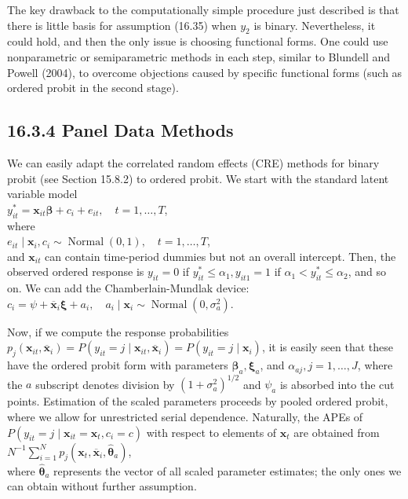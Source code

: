 \documentclass[10pt]{article}
\begin{document}
The key drawback to the computationally simple procedure just described is that there is little basis for assumption (16.35) when $y_{2}$ is binary. Nevertheless, it could hold, and then the only issue is choosing functional forms. One could use nonparametric or semiparametric methods in each step, similar to Blundell and Powell (2004), to overcome objections caused by specific functional forms (such as ordered probit in the second stage).

\subsection*{16.3.4 Panel Data Methods}
We can easily adapt the correlated random effects (CRE) methods for binary probit (see Section 15.8.2) to ordered probit. We start with the standard latent variable model\\
$y_{i t}^{*}=\mathbf{x}_{i t} \boldsymbol{\beta}+c_{i}+e_{i t}, \quad t=1, \ldots, T$,\\
where\\
$e_{i t} \mid \mathbf{x}_{i}, c_{i} \sim \operatorname{Normal}(0,1), \quad t=1, \ldots, T$,\\
and $\mathbf{x}_{i t}$ can contain time-period dummies but not an overall intercept. Then, the observed ordered response is $y_{i t}=0$ if $y_{i t}^{*} \leq \alpha_{1}, y_{i t 1}=1$ if $\alpha_{1}<y_{i t}^{*} \leq \alpha_{2}$, and so on. We can add the Chamberlain-Mundlak device:\\
$c_{i}=\psi+\overline{\mathbf{x}}_{i} \boldsymbol{\xi}+a_{i}, \quad a_{i} \mid \mathbf{x}_{i} \sim \operatorname{Normal}\left(0, \sigma_{a}^{2}\right)$.

Now, if we compute the response probabilities $p_{j}\left(\mathbf{x}_{i t}, \overline{\mathbf{x}}_{i}\right)=P\left(y_{i t}=j \mid \mathbf{x}_{i t}, \overline{\mathbf{x}}_{i}\right)= P\left(y_{i t}=j \mid \mathbf{x}_{i}\right)$, it is easily seen that these have the ordered probit form with parameters $\boldsymbol{\beta}_{a}, \boldsymbol{\xi}_{a}$, and $\alpha_{a j}, j=1, \ldots, J$, where the $a$ subscript denotes division by $\left(1+\sigma_{a}^{2}\right)^{1 / 2}$ and $\psi_{a}$ is absorbed into the cut points. Estimation of the scaled parameters proceeds by pooled ordered probit, where we allow for unrestricted serial dependence. Naturally, the APEs of $P\left(y_{i t}=j \mid \mathbf{x}_{i t}=\mathbf{x}_{t}, c_{i}=c\right)$ with respect to elements of $\mathbf{x}_{t}$ are obtained from\\
$N^{-1} \sum_{i=1}^{N} p_{j}\left(\mathbf{x}_{t}, \overline{\mathbf{x}}_{i}, \hat{\boldsymbol{\theta}}_{a}\right)$,\\
where $\hat{\boldsymbol{\theta}}_{a}$ represents the vector of all scaled parameter estimates; the only ones we can obtain without further assumption.
\end{document}
